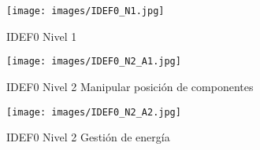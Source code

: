\begin{figure}[hbtp]
\texttt{[image: images/IDEF0\_N1.jpg]}
\caption{IDEF0 Nivel 1}
\end{figure}

\begin{figure}[hbtp]
\texttt{[image: images/IDEF0\_N2\_A1.jpg]}
\caption{IDEF0 Nivel 2 Manipular posici\'on de componentes}
\end{figure}

\begin{figure}[hbtp]
\texttt{[image: images/IDEF0\_N2\_A2.jpg]}
\caption{IDEF0 Nivel 2 Gesti\'on de energ\'ia}
\end{figure}

